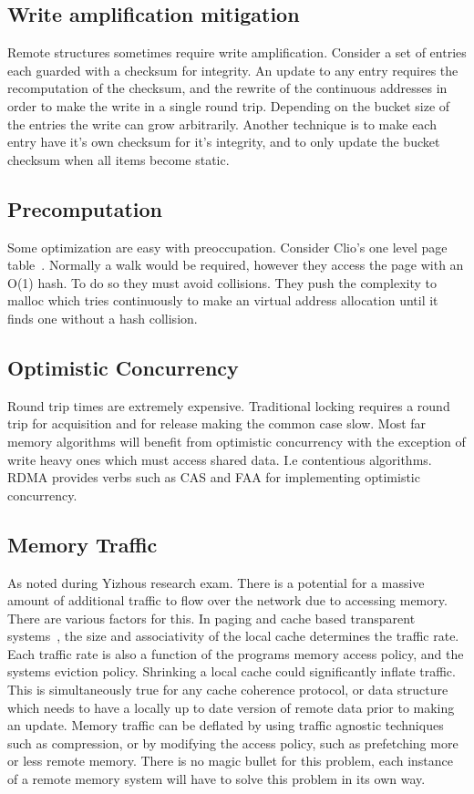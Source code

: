 \subsection{Write amplification mitigation}
\label{sec:write-amplification}
Remote structures sometimes require write
amplification. Consider a set of entries each guarded with a checksum for
integrity. An update to any entry requires the recomputation of the checksum,
and the rewrite of the continuous addresses in order to make the write in a
single round trip. Depending on the bucket size of the entries the write can
grow arbitrarily. Another technique is to make each entry have it's own checksum
for it's integrity, and to only update the bucket checksum when all items become
static.


\subsection{Precomputation} Some optimization are easy with preoccupation. Consider
Clio's one level page table~\cite{clio}. Normally a walk would be required, however they
access the page with an O(1) hash. To do so they must avoid collisions. They
push the complexity to malloc which tries continuously to make an virtual address
allocation until it finds one without a hash collision.

\subsection{Optimistic Concurrency} Round trip times are extremely expensive.
Traditional locking requires a round trip for acquisition and for release making
the common case slow. Most far memory algorithms will benefit from optimistic
concurrency with the exception of write heavy ones which must access shared
data. I.e contentious algorithms. RDMA provides verbs such as CAS and FAA for
implementing optimistic concurrency.

\subsection{Memory Traffic} As noted during Yizhous research exam. There is a
potential for a massive amount of additional traffic to flow over the network
due to accessing memory. There are various factors for this. In paging and cache
based transparent systems~\cite{fastswap,kona,gms,infiniswap,legoos,lite}, the
size and associativity of the local cache determines the traffic rate. Each
traffic rate is also a function of the programs memory access policy, and the
systems eviction policy. Shrinking a local cache could significantly inflate
traffic. This is simultaneously true for any cache coherence protocol, or data
structure which needs to have a locally up to date version of remote data prior
to making an update. Memory traffic can be deflated by using traffic agnostic
techniques such as compression, or by modifying the access policy, such as
prefetching more or less remote memory. There is no magic bullet for this
problem, each instance of a remote memory system will have to solve this problem
in its own way.

